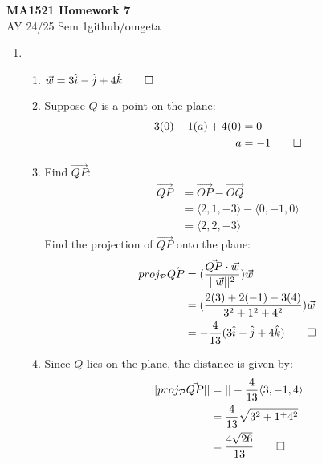 \documentclass[12pt, a4paper]{article}
\newcommand{\mytitle}{MA1521 Homework 7}
\newcommand{\myauthor}{github/omgeta}
\newcommand{\mydate}{AY 24/25 Sem 1}
\begin{document}
\raggedright
\footnotesize
\begin{center}
{\normalsize{\textbf{\mytitle}}} \\
{\footnotesize{\mydate\hspace{2pt}\textemdash\hspace{2pt}\myauthor}}
\end{center}

\begin{enumerate}[Q\arabic*.]
  \item 
    \begin{enumerate}[(\alph*)]
      \item $\vec{w} = 3 \hat{i} - \hat{j} + 4\hat{k}\qed$
      \item Suppose $Q$ is a point on the plane:
        \begin{align*}
          3(0) -1(a) +4(0) &= 0\\
          a &= -1 \qed
        \end{align*}
      \item Find $\vec{QP}$:
        \begin{align*}
          \vec{QP} &= \vec{OP} - \vec{OQ}\\
                   &= \langle 2,1,-3\rangle - \langle 0,-1,0\rangle\\
                   &= \langle 2,2,-3\rangle
        \end{align*}
        Find the projection of $\vec{QP}$ onto the plane:
        \begin{align*}
          proj_{\mathcal{P}}\vec{QP} &= (\frac{\vec{QP}\cdot \vec{w}}{||\vec{w}||^2})\vec{w}\\
                                     &= (\frac{2(3) + 2(-1) -3(4)}{3^2 + 1^2 + 4^2})\vec{w}\\
                                     &= -\frac{4}{13}(3 \hat{i} - \hat{j} + 4 \hat{k})\qed
        \end{align*}
      \item Since $Q$ lies on the plane, the distance is given by:
        \begin{align*}
          ||proj_{\mathcal{P}}\vec{QP}|| &= ||-\frac{4}{13}\langle 3, -1, 4\rangle\\
                                         &= \frac{4}{13}\sqrt{3^2 + 1^ + 4^2}\\
                                         &= \frac{4\sqrt{26}}{13}\qed
        \end{align*}
    \end{enumerate}
  \pagebreak


\end{enumerate}
\end{document}
